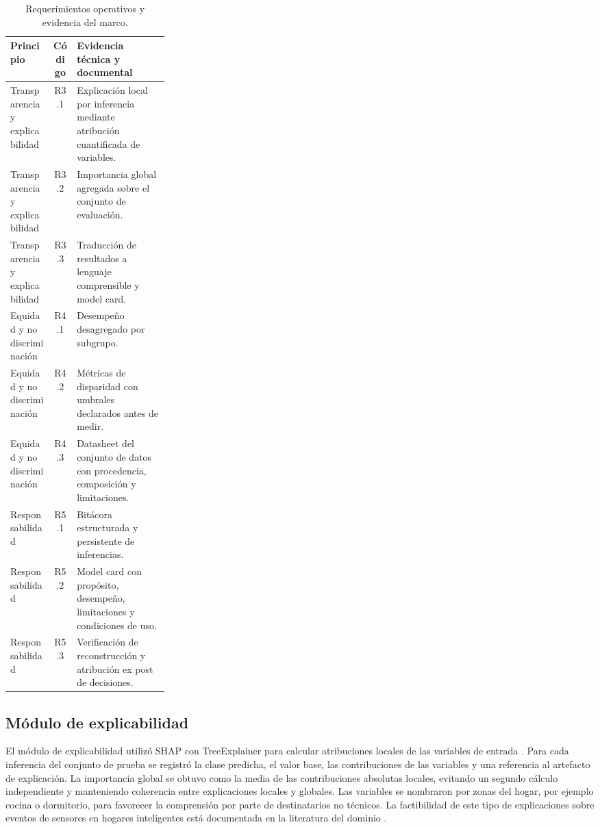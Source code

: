 \begin{table}[htbp]
  \caption{Requerimientos operativos y evidencia del marco.}
  \label{cuadro:requerimientos}
  \small
  \begin{tabularx}{\linewidth}{@{}>{\raggedright\arraybackslash}p{0.27\linewidth}c>{\raggedright\arraybackslash}X@{}}
    \toprule
    Principio & Código & Evidencia técnica y documental \\
    \midrule
    Transparencia y explicabilidad & R3.1 & Explicación local por inferencia mediante atribución cuantificada de variables. \\
    Transparencia y explicabilidad & R3.2 & Importancia global agregada sobre el conjunto de evaluación. \\
    Transparencia y explicabilidad & R3.3 & Traducción de resultados a lenguaje comprensible y model card. \\
    \midrule
    Equidad y no discriminación & R4.1 & Desempeño desagregado por subgrupo. \\
    Equidad y no discriminación & R4.2 & Métricas de disparidad con umbrales declarados antes de medir. \\
    Equidad y no discriminación & R4.3 & Datasheet del conjunto de datos con procedencia, composición y limitaciones. \\
    \midrule
    Responsabilidad & R5.1 & Bitácora estructurada y persistente de inferencias. \\
    Responsabilidad & R5.2 & Model card con propósito, desempeño, limitaciones y condiciones de uso. \\
    Responsabilidad & R5.3 & Verificación de reconstrucción y atribución ex post de decisiones. \\
    \bottomrule
  \end{tabularx}
\end{table}

\subsection{Módulo de explicabilidad}

El módulo de explicabilidad utilizó SHAP con TreeExplainer para calcular
atribuciones locales de las variables de entrada
\cite{lundberg2017shap,lundberg2020treeshap}. Para cada inferencia del conjunto
de prueba se registró la clase predicha, el valor base, las contribuciones de
las variables y una referencia al artefacto de explicación. La importancia
global se obtuvo como la media de las contribuciones absolutas locales, evitando
un segundo cálculo independiente y manteniendo coherencia entre explicaciones
locales y globales. Las variables se nombraron por zonas del hogar, por ejemplo
cocina o dormitorio, para favorecer la comprensión por parte de destinatarios no
técnicos. La factibilidad de este tipo de explicaciones sobre eventos de
sensores en hogares inteligentes está documentada en la literatura del dominio
\cite{arrotta2022dexar}.

